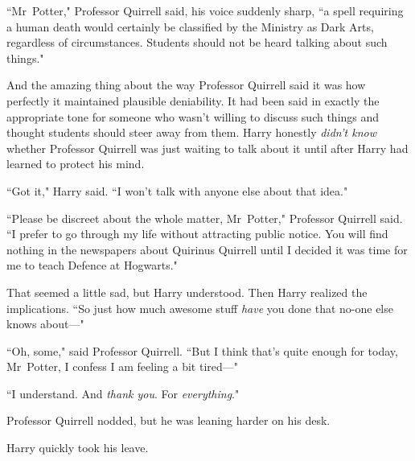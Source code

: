``Mr~Potter," Professor Quirrell said, his voice suddenly sharp, ``a spell requiring a human death would certainly be classified by the Ministry as Dark Arts, regardless of circumstances. Students should not be heard talking about such things."

And the amazing thing about the way Professor Quirrell said it was how perfectly it maintained plausible deniability. It had been said in exactly the appropriate tone for someone who wasn't willing to discuss such things and thought students should steer away from them. Harry honestly \emph{didn't know} whether Professor Quirrell was just waiting to talk about it until after Harry had learned to protect his mind.

``Got it," Harry said. ``I won't talk with anyone else about that idea."

``Please be discreet about the whole matter, Mr~Potter," Professor Quirrell said. ``I prefer to go through my life without attracting public notice. You will find nothing in the newspapers about Quirinus Quirrell until I decided it was time for me to teach Defence at Hogwarts."

That seemed a little sad, but Harry understood. Then Harry realized the implications. ``So just how much awesome stuff \emph{have} you done that no-one else knows about—"

``Oh, some," said Professor Quirrell. ``But I think that's quite enough for today, Mr~Potter, I confess I am feeling a bit tired—"

``I understand. And \emph{thank you}. For \emph{everything}."

Professor Quirrell nodded, but he was leaning harder on his desk.

Harry quickly took his leave.

